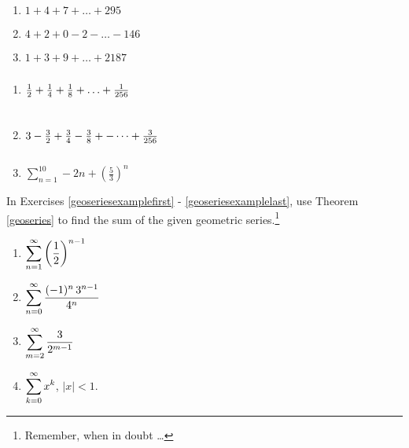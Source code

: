 \begin{multicols}{3}
\begin{enumerate}
\setcounter{enumi}{\value{HW}}

\item  $1+4+7+ \ldots +295$  

\item  $4+2+0-2- \ldots - 146$  

\item $1+3+9+ \ldots + 2187$ 
\setcounter{HW}{\value{enumi}}
\end{enumerate}
\end{multicols}

\begin{multicols}{3}
\begin{enumerate}
\setcounter{enumi}{\value{HW}}

\item  $\frac{1}{2} + \frac{1}{4} + \frac{1}{8} + \ldots + \frac{1}{256}\vphantom{\displaystyle \sum_{n = 1}^{10} -2n + \left(\frac{5}{3}\right)^{n}}$ 

\item $3 - \frac{3}{2} + \frac{3}{4} - \frac{3}{8}+- \dots +\frac{3}{256} \vphantom{\displaystyle \sum_{n = 1}^{10} -2n + \left(\frac{5}{3}\right)^{n}}$



\item $\displaystyle \sum_{n = 1}^{10} -2n + \left(\frac{5}{3}\right)^{n}$ \label{findsumformulalast}

\setcounter{HW}{\value{enumi}}
\end{enumerate}
\end{multicols}



In Exercises \ref{geoseriesexamplefirst} - \ref{geoseriesexamplelast}, use Theorem \ref{geoseries} to find the sum of the given geometric series.\footnote{Remember, when in doubt \ldots}

\begin{multicols}{4}
\begin{enumerate}
\setcounter{enumi}{\value{HW}}
\item $\displaystyle{ \sum_{n = 1}^{\infty} \left( \frac{1}{2} \right)^{n-1}}$  \label{geoseriesexamplefirst}
\item $\displaystyle{ \sum_{n = 0}^{\infty}  \dfrac{(-1)^n \, 3^{n-1}}{4^{n}}}$ 
\item $\displaystyle{ \sum_{m = 2}^{\infty}   \dfrac{3}{2^{m-1}}}$ 
\item $\displaystyle{ \sum_{k =0}^{\infty}  x^{k}}$, $|x|<1$.  \label{geoseriesexamplelast}
\setcounter{HW}{\value{enumi}}
\end{enumerate}

\end{multicols}


